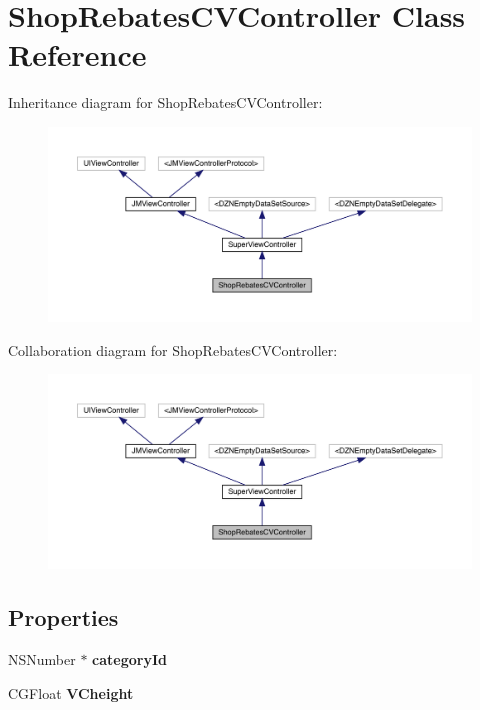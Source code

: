 \hypertarget{interface_shop_rebates_c_v_controller}{}\section{Shop\+Rebates\+C\+V\+Controller Class Reference}
\label{interface_shop_rebates_c_v_controller}


Inheritance diagram for Shop\+Rebates\+C\+V\+Controller\+:\nopagebreak
\begin{figure}[H]
\begin{center}
\leavevmode
\includegraphics[width=350pt]{interface_shop_rebates_c_v_controller__inherit__graph}
\end{center}
\end{figure}


Collaboration diagram for Shop\+Rebates\+C\+V\+Controller\+:\nopagebreak
\begin{figure}[H]
\begin{center}
\leavevmode
\includegraphics[width=350pt]{interface_shop_rebates_c_v_controller__coll__graph}
\end{center}
\end{figure}
\subsection*{Properties}
\begin{DoxyCompactItemize}
\item 
\mbox{\label{interface_shop_rebates_c_v_controller_a8ab20d98944a2aa38ebb7aaf67f2000f}} 
N\+S\+Number $\ast$ {\bfseries category\+Id}
\item 
\mbox{\label{interface_shop_rebates_c_v_controller_a8b73f405d674ea9410f92acfef50f5e3}} 
C\+G\+Float {\bfseries V\+Cheight}
\end{DoxyCompactItemize}
